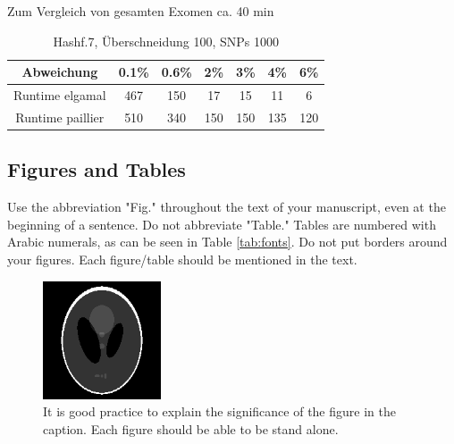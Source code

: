 \documentclass[10pt,a4paper,oneside,twocolumn]{article}
\begin{document}
 Zum Vergleich von gesamten Exomen ca. 40 min

	

	\begin{table}[h]
		
		\begin{tabular}{c|c|c|c|c|c|c}
			Abweichung&0.1\%&0.6\%&2\%&3\%&4\%&6\%\\
			\hline
			Runtime elgamal&467&150&17&15&11&6\\
			Runtime paillier&510&340&150&150&135&120\\
			
			
		\end{tabular}
		\caption{Hashf.7, Überschneidung 100, SNPs 1000 }
		\label{tab:meinetabelle7}
	\end{table}
	

 	
\subsection{Figures and Tables}
Use the abbreviation "Fig." throughout the text of your manuscript, even at the beginning of a sentence. Do not abbreviate "Table." Tables are numbered with Arabic numerals, as can be seen in Table \ref{tab:fonts}. Do not put borders around your figures. Each figure/table should be mentioned in the text.
\begin{figure}[!h]
\centering
\includegraphics[width=3.5cm]{fig.png}
\caption{It is good practice to explain the significance of the figure in the caption. Each figure should be able to be stand alone.}
\label{fig:phantom}
\end{figure}
\end{document}
